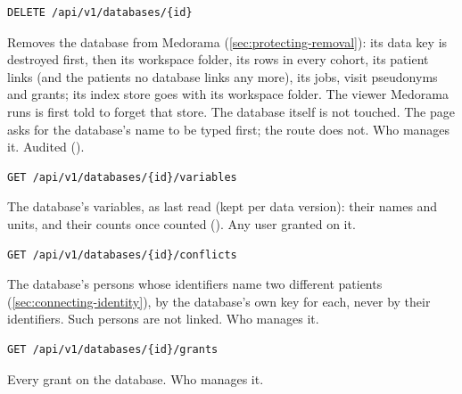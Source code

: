\begin{lstlisting}[style=signature]
DELETE /api/v1/databases/{id}
\end{lstlisting}
Removes the database from Medorama (\cref{sec:protecting-removal}): its data key is destroyed
first, then its workspace folder, its rows in every cohort, its patient links (and the patients
no database links any more), its jobs, visit pseudonyms and grants; its index store goes with its workspace folder. The
viewer Medorama runs is first told to forget that store. The database itself is not touched. The page asks for the
database's name to be typed first; the route does not. Who manages it. Audited ().

\begin{lstlisting}[style=signature]
GET /api/v1/databases/{id}/variables
\end{lstlisting}
The database's variables, as last read (kept per data version): their names and units, and
their counts once counted (). Any user granted 
on it.

\begin{lstlisting}[style=signature]
GET /api/v1/databases/{id}/conflicts
\end{lstlisting}
The database's persons whose identifiers name two different patients
(\cref{sec:connecting-identity}), by the database's own key for each, never by their
identifiers. Such persons are not linked. Who manages it.

\begin{lstlisting}[style=signature]
GET /api/v1/databases/{id}/grants
\end{lstlisting}
Every grant on the database. Who manages it.

